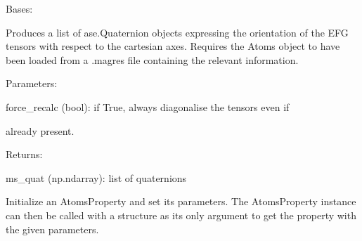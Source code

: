 \documentclass[letterpaper,10pt,english]{sphinxmanual}
\begin{document}

\begin{fulllineitems}
\label{doctree/soprano.properties.nmr.efg:soprano.properties.nmr.efg.EFGQuaternion}
Bases: {\hyperref[doctree/soprano.properties.atomsproperty:soprano.properties.atomsproperty.AtomsProperty]{\emph{}}}

Produces a list of ase.Quaternion objects expressing the orientation of
the EFG tensors with respect to the cartesian axes.
Requires the Atoms object to have been loaded from a .magres file
containing the relevant information.

\begin{DUlineblock}{0em}
\item[] Parameters:
\item[]
\begin{DUlineblock}{\DUlineblockindent}
\item[] force\_recalc (bool): if True, always diagonalise the tensors even if
\item[]
\begin{DUlineblock}{\DUlineblockindent}
\item[] already present.
\end{DUlineblock}
\end{DUlineblock}
\end{DUlineblock}

\begin{DUlineblock}{0em}
\item[] Returns:
\item[]
\begin{DUlineblock}{\DUlineblockindent}
\item[] ms\_quat (np.ndarray): list of quaternions
\end{DUlineblock}
\end{DUlineblock}

Initialize an AtomsProperty and set its parameters.
The AtomsProperty instance can then be called with a structure as its
only argument to get the property with the given parameters.


\end{fulllineitems}
\end{document}
